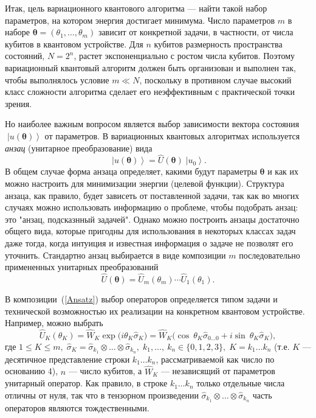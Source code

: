 \documentclass[a4paper]{report}
\newcommand{\ket}[1] {\!\!\;\ensuremath{\left|#1\right\rangle}}
\begin{document}
Итак, цель вариационного квантового алгоритма --- найти такой набор параметров, на котором энергия достигает минимума. Число параметров $m$ в наборе $\bm\theta=(\theta_1, \ldots,\theta_m)$ зависит от конкретной задачи, в частности, от числа кубитов в квантовом устройстве. Для $n$ кубитов размерность пространства состояний, $N=2^n$, растет экспоненциально с ростом числа кубитов. Поэтому вариационный квантовый алгоритм должен быть организован и выполнен так, чтобы выполнялось условие $m\ll N$, поскольку в противном случае высокий класс сложности алгоритма сделает его неэффективным с практической точки зрения.

Но наиболее важным вопросом является выбор зависимости вектора состояния $\ket{u(\bm\theta)}$ от параметров. В вариационных квантовых алгоритмах используется \textit{анзац} (унитарное преобразование) вида
\begin{equation}\label{u(theta)}
\ket{u(\bm\theta)}= \hat{U}(\bm\theta)\ket{u_0}.
\end{equation}
В общем случае форма анзаца определяет, какими будут параметры $\boldsymbol\theta$ и как их можно настроить для минимизации энергии (целевой функции). Структура анзаца, как правило, будет зависеть от поставленной задачи, так как во многих случаях можно использовать информацию о проблеме, чтобы подобрать анзац: это "анзац, подсказнный задачей". Однако можно построить анзацы достаточно общего вида, которые пригодны для использования в некоторых классах задач даже тогда, когда интуиция и известная информация о задаче не позволят его уточнить. Стандартно анзац выбирается в виде композиции $m$ последовательно примененных унитарных преобразований
\begin{equation}\label{Ansatz}
\hat{U}(\boldsymbol\theta)= \hat{U}_{m}(\theta_m)\cdots \hat{U}_{1}(\theta_1).
\end{equation}

В композиции~(\ref{Ansatz}) выбор операторов определяется типом задачи и технической возможностью их реализации на конкретном квантовом устройстве. Например, можно выбрать
\begin{equation}\label{Ansatz1}
\hat{U}_{K}(\theta_K)= \hat{W}_K\exp\!\big(i\theta_K\hat{\sigma}_K\big)= \hat{W}_K\big(\cos\:\!\!\theta_K\hat{\sigma}_{0\ldots0}+ i\sin\:\!\!\theta_K\hat{\sigma}_K\big),
\end{equation}
где $1\!\leqslant\! K\!\leqslant\! m,\; \hat{\sigma}_K\!=\! \hat{\sigma}_{k_1}\!\otimes\ldots\otimes\hat{\sigma}_{k_n},\; k_1,\!\ldots,\:\!\!k_n\!\in\!\{0,1,2,3\},\; K\!=\!k_1\!\ldots k_n$\linebreak
(т.е. $K$ --- десятичное представление строки $k_1\ldots k_n$, рассматриваемой как число по основанию 4), $n$ --- число кубитов, а $\hat{W}_K$ --- независящий от параметров унитарный оператор. Как правило, в строке $k_1\ldots k_n$ только отдельные числа отличны от нуля, так что в тензорном произведении ${\hat{\sigma}_{k_1}\!\otimes\ldots \otimes \hat{\sigma}_{k_n}}$ часть операторов являются тождественными.
\end{document}
